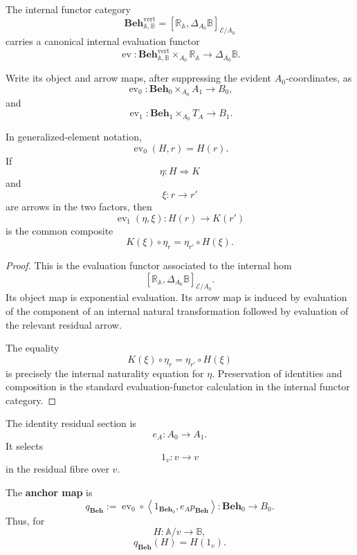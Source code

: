 \begin{theorem}
\label{thm:internal-evaluation-residual-behaviours}
    The internal functor category
    \[
        \mathbf{Beh}^{\mathrm{vert}}_{\mathbb A,\mathbb B}
        =
        [\mathbb R_{\mathbb A},
         \Delta_{A_0}\mathbb B]_{\mathcal E/A_0}
    \]
    carries a canonical internal evaluation functor
    \[
        \operatorname{ev}:
        \mathbf{Beh}^{\mathrm{vert}}_{\mathbb A,\mathbb B}
        \times_{A_0}
        \mathbb R_{\mathbb A}
        \longrightarrow
        \Delta_{A_0}\mathbb B.
    \]

    Write its object and arrow maps, after suppressing the evident
    \(A_0\)-coordinates, as
    \[
        \operatorname{ev}_0:
        \mathbf{Beh}_0
        \times_{A_0}
        A_1
        \longrightarrow
        B_0,
    \]
    and
    \[
        \operatorname{ev}_1:
        \mathbf{Beh}_1
        \times_{A_0}
        T_A
        \longrightarrow
        B_1.
    \]

    In generalized-element notation,
    \[
        \operatorname{ev}_0(H,r)=H(r).
    \]
    If
    \[
        \eta:H\Rightarrow K
    \]
    and
    \[
        \xi:r\to r'
    \]
    are arrows in the two factors, then
    \[
        \operatorname{ev}_1(\eta,\xi):
        H(r)\to K(r')
    \]
    is the common composite
    \[
        K(\xi)\circ\eta_r
        =
        \eta_{r'}\circ H(\xi).
    \]
\end{theorem}
\begin{proof}
    This is the evaluation functor associated to the internal hom
    \[
        [\mathbb R_{\mathbb A},
         \Delta_{A_0}\mathbb B]_{\mathcal E/A_0}.
    \]
    Its object map is exponential evaluation. Its arrow map is induced by
    evaluation of the component of an internal natural transformation
    followed by evaluation of the relevant residual arrow.

    The equality
    \[
        K(\xi)\circ\eta_r
        =
        \eta_{r'}\circ H(\xi)
    \]
    is precisely the internal naturality equation for \(\eta\). Preservation
    of identities and composition is the standard evaluation-functor
    calculation in the internal functor category.
\end{proof}

\begin{definition}
\label{def:anchor-evaluation}
    The identity residual section is
    \[
        e_A:A_0\to A_1.
    \]
    It selects
    \[
        1_v:v\to v
    \]
    in the residual fibre over \(v\).

    The \textbf{anchor map} is
    \[
        q_{\mathbf{Beh}}
        :=
        \operatorname{ev}_0
        \circ
        \left\langle
            1_{\mathbf{Beh}_0},
            e_Ap_{\mathbf{Beh}}
        \right\rangle:
        \mathbf{Beh}_0\to B_0.
    \]
    Thus, for
    \[
        H:\mathbb A/v\to\mathbb B,
    \]
    \[
        q_{\mathbf{Beh}}(H)
        =
        H(1_v).
    \]
\end{definition}

